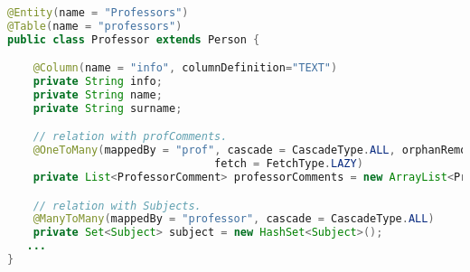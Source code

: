 \begin{lstlisting}[language=Java,  basicstyle=\footnotesize]
@Entity(name = "Professors")
@Table(name = "professors")
public class Professor extends Person {

	@Column(name = "info", columnDefinition="TEXT")
	private String info;
	private String name;
	private String surname;

	// relation with profComments.
	@OneToMany(mappedBy = "prof", cascade = CascadeType.ALL, orphanRemoval = true, 
								fetch = FetchType.LAZY)
	private List<ProfessorComment> professorComments = new ArrayList<ProfessorComment>();

	// relation with Subjects.
	@ManyToMany(mappedBy = "professor", cascade = CascadeType.ALL)
	private Set<Subject> subject = new HashSet<Subject>();
   ...
}
\end{lstlisting}